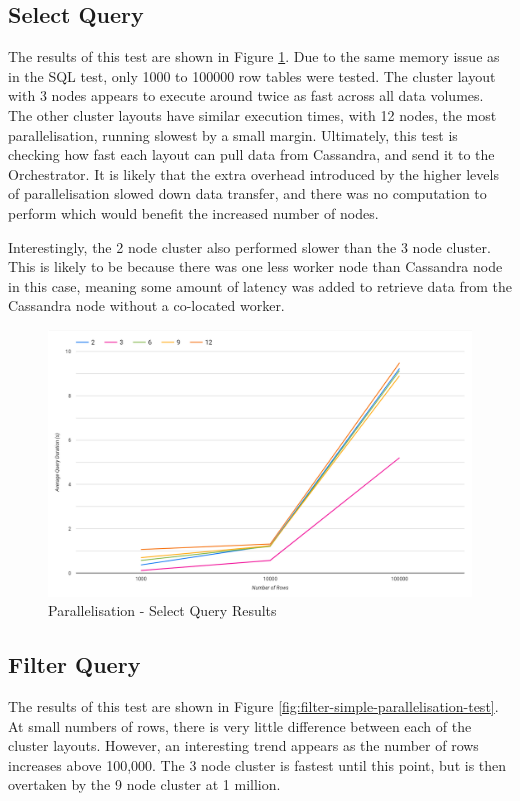 \subsection{Select Query}
The results of this test are shown in Figure \ref{fig:select-simple-parallelisation-test}. Due to the same memory issue as in the SQL test, only 1000 to 100000 row tables were tested. The cluster layout with 3 nodes appears to execute around twice as fast across all data volumes. The other cluster layouts have similar execution times, with 12 nodes, the most parallelisation, running slowest by a small margin. Ultimately, this test is checking how fast each layout can pull data from Cassandra, and send it to the Orchestrator. It is likely that the extra overhead introduced by the higher levels of parallelisation slowed down data transfer, and there was no computation to perform which would benefit the increased number of nodes.

Interestingly, the 2 node cluster also performed slower than the 3 node cluster. This is likely to be because there was one less worker node than Cassandra node in this case, meaning some amount of latency was added to retrieve data from the Cassandra node without a co-located worker.

\begin{figure}[h]
	\centering
	\includegraphics[width=0.8\linewidth]{chapters/diagrams/testing/select-simple-parallelisation-test}
	\caption{Parallelisation - Select Query Results}
	\label{fig:select-simple-parallelisation-test}
\end{figure}

\subsection{Filter Query}
The results of this test are shown in Figure \ref{fig:filter-simple-parallelisation-test}. At small numbers of rows, there is very little difference between each of the cluster layouts. However, an interesting trend appears as the number of rows increases above 100,000. The 3 node cluster is fastest until this point, but is then overtaken by the 9 node cluster at 1 million.

